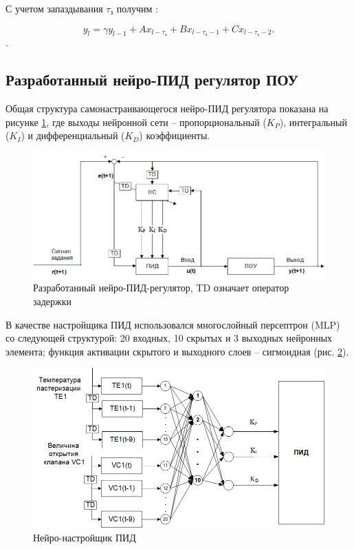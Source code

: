 С учетом запаздывания $\tau_\text{з}$ получим \cite{Нетушил1978}:

\begin{equation}
    y_l = \gamma y_{l - 1} + Ax_{l - \tau_\text{з}} + Bx_{l - \tau_\text{з} - 1} + Cx_{l - \tau_\text{з} - 2}.
\end{equation}.

\subsection{Разработанный нейро-ПИД регулятор ПОУ}

Общая структура самонастраивающегося нейро-ПИД регулятора показана на рисунке \ref{fig:neuro_PID_controller}, где выходы нейронной сети – пропорциональный ($K_P$), интегральный ($K_I$) и дифференциальный ($K_D$) коэффициенты.

\begin{figure}[H]
    \centering
    \includegraphics[width=\textwidth]{images/chapter_2/Разработанный нейро-контроллер.png}
    \caption{Разработанный нейро-ПИД-регулятор, TD означает оператор задержки}
    \label{fig:neuro_PID_controller}
\end{figure}

В качестве настройщика ПИД использовался многослойный персептрон (MLP) со следующей структурой: 20 входных, 10 скрытых и 3 выходных нейронных элемента; функция активации скрытого и выходного слоев – сигмоидная (рис. \ref{fig:PID_neuro_tuner}).

\begin{figure}[H]
    \centering
    \includegraphics[width=\textwidth]{images/chapter_2/Нейро-настройщик ПИД.png}
    \caption{Нейро-настройщик ПИД}
    \label{fig:PID_neuro_tuner}
\end{figure}